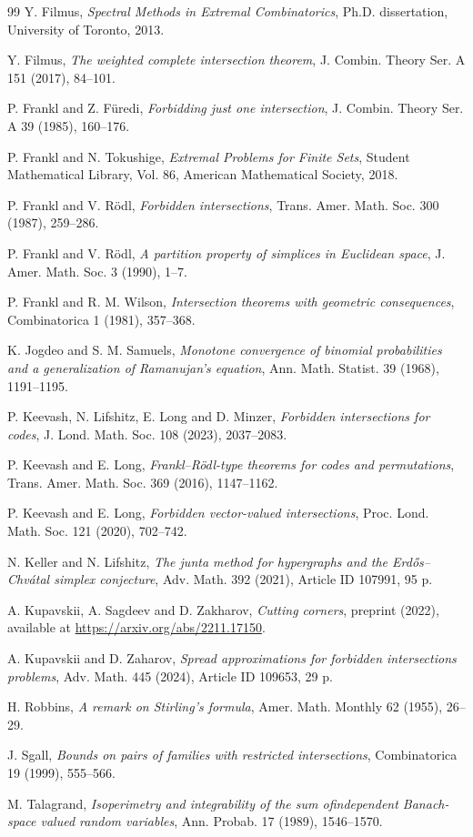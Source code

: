 \documentclass[10pt,a4paper]{amsart}
\theoremstyle{remark}
\begin{document}
\begin{thebibliography}{99}
 Y. Filmus,
\textit{Spectral Methods in Extremal Combinatorics},
Ph.D. dissertation, University of Toronto, 2013.

 Y. Filmus,
\textit{The weighted complete intersection theorem},
J. Combin. Theory Ser. A 151 (2017), 84--101.

 P. Frankl and Z. F\"{u}redi,
\emph{Forbidding just one intersection}, J. Combin. Theory Ser. A 39 (1985), 160--176.

 P. Frankl and N. Tokushige,
\emph{Extremal Problems for Finite Sets},
Student Mathematical Library, Vol. 86, American Mathematical Society, 2018.

 P. Frankl and V. R\"{o}dl,
\emph{Forbidden intersections}, Trans. Amer. Math. Soc. 300 (1987), 259--286.

 P. Frankl and V. R\"{o}dl,
\emph{A partition property of simplices in Euclidean space},
J. Amer. Math. Soc. 3 (1990), 1--7.

 P. Frankl and R. M. Wilson,
\emph{Intersection theorems with geometric consequences},
Combinatorica 1 (1981), 357--368.

 K. Jogdeo and S. M. Samuels,
\emph{Monotone convergence of binomial probabilities and a generalization of Ramanujan's equation},
Ann. Math. Statist. 39 (1968), 1191--1195.

 P. Keevash, N. Lifshitz, E. Long and D. Minzer,
\emph{Forbidden intersections for codes},
J. Lond. Math. Soc. 108 (2023), 2037--2083.

 P. Keevash and E. Long,
\emph{Frankl--R\"{o}dl-type theorems for codes and permutations},
Trans. Amer. Math. Soc. 369 (2016), 1147--1162.

 P. Keevash and E. Long,
\emph{Forbidden vector-valued intersections},
Proc. Lond. Math. Soc. 121 (2020), 702--742.

 N. Keller and N. Lifshitz,
\emph{The junta method for hypergraphs and the Erd\H{o}s--Chv\'{a}tal simplex conjecture},
Adv. Math. 392 (2021), Article ID 107991, 95 p.

 A. Kupavskii, A. Sagdeev and D. Zakharov,
\emph{Cutting corners}, preprint (2022), available at \url{https://arxiv.org/abs/2211.17150}.

 A. Kupavskii and D. Zaharov,
\emph{Spread approximations for forbidden intersections problems},
Adv. Math. 445 (2024), Article ID 109653, 29 p.

 H. Robbins,
\textit{A remark on Stirling's formula},
Amer. Math. Monthly 62 (1955), 26--29.

 J. Sgall,
\emph{Bounds on pairs of families with restricted intersections},
Combinatorica 19 (1999), 555--566.

 M. Talagrand,
\emph{Isoperimetry and integrability of the sum ofindependent Banach-space valued random variables},
Ann. Probab. 17 (1989), 1546--1570.

\end{thebibliography}
\end{document}
